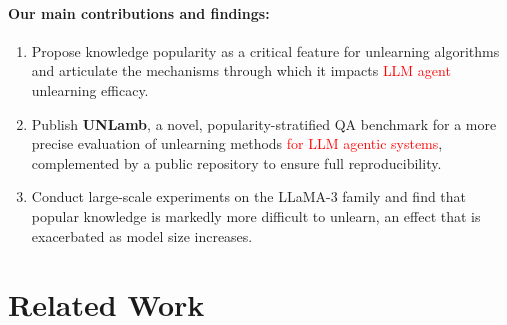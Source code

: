 \documentclass[sigconf,anonymous]{aamas}
\begin{document}
\paragraph{Our main contributions and findings:}
\begin{enumerate}
    \item Propose knowledge popularity as a critical feature for unlearning algorithms and articulate the mechanisms through which it impacts \textcolor{red}{LLM agent} unlearning efficacy.
    \item Publish \textbf{UNLamb}, a novel, popularity-stratified QA benchmark for a more precise evaluation of unlearning methods \textcolor{red}{for LLM agentic systems}, complemented by a public repository to ensure full reproducibility.
    \item Conduct large-scale experiments on the LLaMA-3 family and find that popular knowledge is markedly more difficult to unlearn, an effect that is exacerbated as model size increases.
\end{enumerate}





\section{Related Work}
\label{sec:rw}
\end{document}
